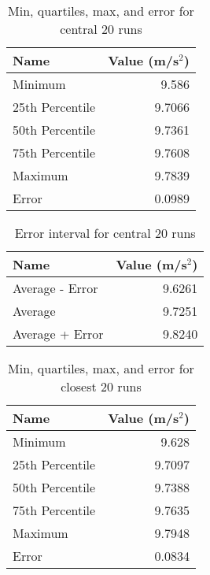 \newpage
\begin{table}[ht]
    \centering
    \begin{tabular}{|l|r|}
        \hline
        Name & Value (m/s$^{2}$) \\
        \hline
        Minimum & 9.586 \\
        25th Percentile & 9.7066 \\
        50th Percentile & 9.7361 \\
        75th Percentile & 9.7608 \\
        Maximum & 9.7839 \\
        Error & 0.0989 \\
        \hline
    \end{tabular}
    \caption{Min, quartiles, max, and error for central 20 runs}
    \label{table:01.describe.20.center}
\end{table}
\begin{table}[ht]
    \centering
    \begin{tabular}{|l|r|}
        \hline
        Name & Value (m/s$^{2}$) \\
        \hline
        Average - Error & 9.6261 \\
        Average & 9.7251 \\
        Average + Error & 9.8240 \\
        \hline
    \end{tabular}
    \caption{Error interval for central 20 runs}
    \label{table:01.error.20.center}
\end{table}
\begin{table}[ht]
    \centering
    \begin{tabular}{|l|r|}
        \hline
        Name & Value (m/s$^{2}$) \\
        \hline
        Minimum & 9.628 \\
        25th Percentile & 9.7097 \\
        50th Percentile & 9.7388 \\
        75th Percentile & 9.7635 \\
        Maximum & 9.7948 \\
        Error & 0.0834 \\
        \hline
    \end{tabular}
    \caption{Min, quartiles, max, and error for closest 20 runs}
    \label{table:01.describe.20.close}
\end{table}
